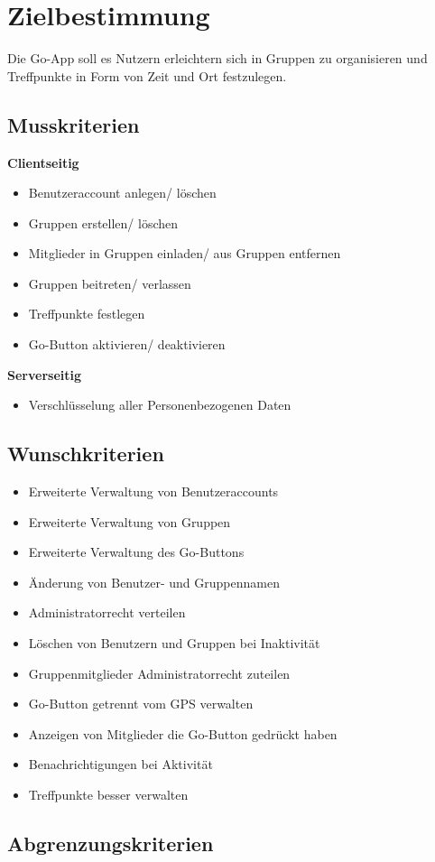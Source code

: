 \section{Zielbestimmung}
Die Go-App soll es Nutzern erleichtern sich in Gruppen zu organisieren
und Treffpunkte in Form von Zeit und Ort festzulegen.
\subsection{Musskriterien}

\textbf{Clientseitig}
\begin{itemize}
	\item Benutzeraccount anlegen/ löschen
	\item Gruppen erstellen/ löschen
	\item Mitglieder in Gruppen einladen/ aus Gruppen entfernen
	\item Gruppen beitreten/ verlassen
	\item Treffpunkte festlegen
	\item Go-Button aktivieren/ deaktivieren
\end{itemize}

\textbf{Serverseitig}
\begin{itemize}
	\item Verschlüsselung aller Personenbezogenen Daten	
\end{itemize}

\subsection{Wunschkriterien}
\begin{itemize}
	\item Erweiterte Verwaltung von Benutzeraccounts
	\item Erweiterte Verwaltung von Gruppen
	\item Erweiterte Verwaltung des Go-Buttons
	
	
	\item Änderung von Benutzer- und Gruppennamen
	\item Administratorrecht verteilen
	\item Löschen von Benutzern und Gruppen bei Inaktivität
	\item Gruppenmitglieder Administratorrecht zuteilen
	\item Go-Button getrennt vom GPS verwalten
	\item Anzeigen von Mitglieder die Go-Button gedrückt haben
	\item Benachrichtigungen bei Aktivität
	\item Treffpunkte besser verwalten
\end{itemize}


\subsection{Abgrenzungskriterien}
